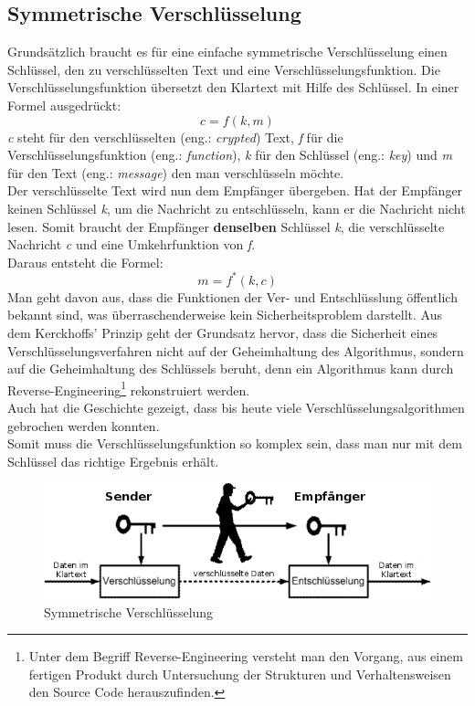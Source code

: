 \subsection{Symmetrische Verschlüsselung}
Grundsätzlich braucht es für eine einfache symmetrische Verschlüsselung einen Schlüssel, den zu verschlüsselten Text und eine Verschlüsselungsfunktion.
Die Verschlüsselungsfunktion übersetzt den Klartext mit Hilfe des Schlüssel. In einer Formel ausgedrückt:
\begin{equation*}
  c = f ( k, m )
\label{eqn:sym_versch}
\end{equation*}
\textit{c} steht für den verschlüsselten  (eng.: \textit{crypted}) Text, \textit{f} für die Verschlüsselungsfunktion (eng.: \textit{function}), \textit{k} für den Schlüssel (eng.: \textit{key}) und \textit{m} für den Text (eng.: \textit{message}) den man verschlüsseln möchte.\\
%
Der verschlüsselte Text wird nun dem Empfänger übergeben. Hat der Empfänger keinen Schlüssel \textit{k}, um die Nachricht zu entschlüsseln, kann er die Nachricht nicht lesen. Somit braucht der Empfänger \textbf{denselben} Schlüssel \textit{k}, die verschlüsselte Nachricht \textit{c} und eine Umkehrfunktion von \textit{f}.\\
Daraus entsteht die Formel:
\begin{equation*}
  m = f^*(k ,c)
\label{eqn:sym_entsch}
\end{equation*}
Man geht davon aus, dass die Funktionen der Ver- und Entschlüsslung öffentlich bekannt sind, was überraschenderweise kein Sicherheitsproblem darstellt. Aus dem Kerckhoffs' Prinzip geht der Grundsatz hervor, dass die Sicherheit eines Verschlüsselungsverfahren nicht auf der Geheimhaltung des Algorithmus, sondern auf die Geheimhaltung des Schlüssels beruht, denn ein Algorithmus kann durch Reverse-Engineering\footnote{Unter dem Begriff Reverse-Engineering versteht man den Vorgang, aus einem fertigen Produkt durch Untersuchung der Strukturen und Verhaltensweisen den Source Code herauszufinden.} rekonstruiert werden.\\
Auch hat die Geschichte gezeigt, dass bis heute viele Verschlüsselungsalgorithmen gebrochen werden konnten. \cite{mod_kry}\\
%
Somit muss die Verschlüsselungsfunktion so komplex sein, dass man nur mit dem Schlüssel das richtige Ergebnis erhält.
%
\begin{figure}[ht]
\begin{center}
\includegraphics[width=15cm]{images/symmetrischeVerschluesselung.png}
\caption{Symmetrische Verschlüsselung}
\label{fig:symVersch}
\end{center}
\end{figure}
